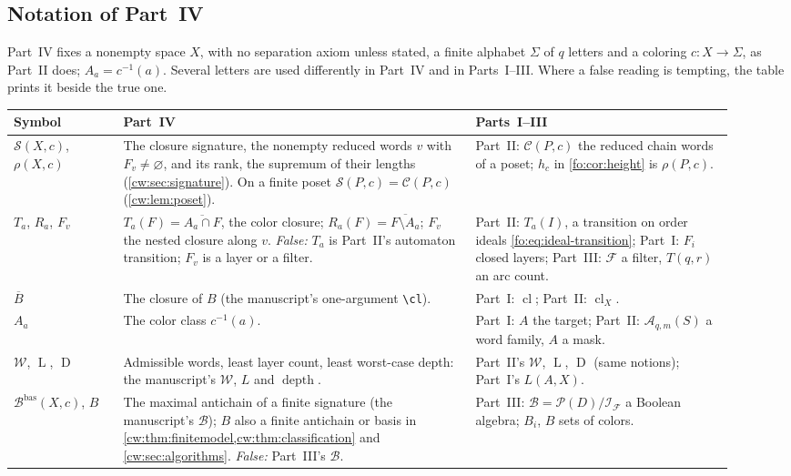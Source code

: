 \documentclass[11pt,letterpaper]{article}
\numberwithin{equation}{section}
\theoremstyle{definition}
\theoremstyle{remark}
\theoremstyle{definition}
\newcommand{\cl}{\operatorname{cl}}
\newcommand{\W}{\mathcal W}
\newcommand{\C}{\mathcal C}
\newcommand{\A}{\mathcal A}
\newcommand{\depth}{\operatorname{D}}
\newcommand{\layers}{\operatorname{L}}
\newcommand{\F}{\mathcal F}
\newcommand{\I}{\mathcal I}
\newcommand{\B}{\mathcal B}
\newcommand{\PP}{\mathcal P}
\newcommand{\cwcl}[1]{\overline{#1}}
\newcommand{\cwSig}{\mathcal S}
\newcommand{\cwBas}{\mathcal B^{\mathrm{bas}}}
\begin{document}
\subsection{Notation of Part~IV}
\label{cw:sec:notation}
Part~IV fixes a nonempty space $X$, with no separation axiom unless stated, a
finite alphabet $\Sigma$ of $q$ letters and a coloring $c:X\to\Sigma$, as
Part~II does; $A_a=c^{-1}(a)$. Several letters are used differently in
Part~IV and in Parts~I--III. Where a false reading is tempting, the table
prints it beside the true one.
\begin{center}\small
\begin{longtable}{@{}>{\raggedright\arraybackslash}p{0.14\linewidth}>{\raggedright\arraybackslash}p{0.45\linewidth}>{\raggedright\arraybackslash}p{0.33\linewidth}@{}}
\toprule
Symbol & Part~IV & Parts~I--III\\
\midrule
\endhead
$\cwSig(X,c)$, $\rho(X,c)$ & The closure signature, the nonempty reduced
words $v$ with $F_v\ne\varnothing$, and its rank, the supremum of their
lengths (\cref{cw:sec:signature}). On a finite poset $\cwSig(P,c)=\C(P,c)$
(\cref{cw:lem:poset}). & Part~II: $\C(P,c)$ the reduced chain words of a
poset; $h_c$ in \cref{fo:cor:height} is $\rho(P,c)$.\\
$T_a$, $R_a$, $F_v$ & $T_a(F)=\cwcl{A_a\cap F}$, the color closure;
$R_a(F)=\cwcl{F\setminus A_a}$; $F_v$ the nested closure along $v$.
\emph{False:} $T_a$ is Part~II's automaton transition; $F_v$ is a layer or a
filter. & Part~II: $T_a(I)$, a transition on order ideals
\eqref{fo:eq:ideal-transition}; Part~I: $F_i$ closed layers; Part~III: $\F$ a
filter, $T(q,r)$ an arc count.\\
$\cwcl{B}$ & The closure of $B$ (the manuscript's one-argument \verb|\cl|). &
Part~I: $\cl$; Part~II: $\cl_X$.\\
$A_a$ & The color class $c^{-1}(a)$. & Part~I: $A$ the target; Part~II:
$\A_{q,m}(S)$ a word family, $A$ a mask.\\
$\W$, $\layers$, $\depth$ & Admissible words, least layer count, least
worst-case depth: the manuscript's $\mathcal W$, $L$ and
$\operatorname{depth}$. & Part~II's $\W$, $\layers$, $\depth$ (same
notions); Part~I's $L(A,X)$.\\
$\cwBas(X,c)$, $B$ & The maximal antichain of a finite signature (the
manuscript's $\mathcal B$); $B$ also a finite antichain or basis in
\cref{cw:thm:finitemodel,cw:thm:classification} and \cref{cw:sec:algorithms}.
\emph{False:} Part~III's $\B$. & Part~III: $\B=\PP(D)/\I_\F$ a Boolean
algebra; $B_i$, $B$ sets of colors.\\

\end{longtable}
\end{center}
\end{document}
